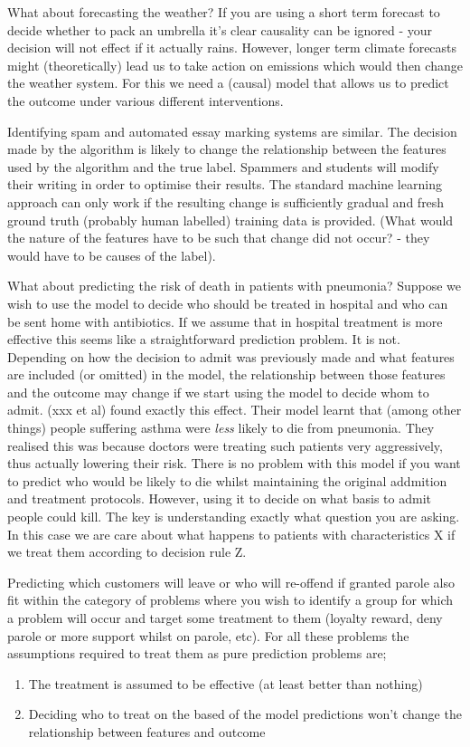 \documentclass[11pt,a4paper,oneside]{book}
\theoremstyle{plain}
\theoremstyle{definition}
\begin{document}
What about forecasting the weather? If you are using a short term forecast to decide whether to pack an umbrella it's clear causality can be ignored - your decision will not effect if it actually rains. However, longer term climate forecasts might (theoretically) lead us to take action on emissions which would then change the weather system. For this we need a (causal) model that allows us to predict the outcome under various different interventions.

Identifying spam and automated essay marking systems are similar. The decision made by the algorithm is likely to change the relationship between the features used by the algorithm and the true label. Spammers and students will modify their writing in order to optimise their results. The standard machine learning approach can only work if the resulting change is sufficiently gradual and fresh ground truth (probably human labelled) training data is provided. (What would the nature of the features have to be such that change did not occur? - they would have to be causes of the label). 

What about predicting the risk of death in patients with pneumonia? Suppose we wish to use the model to decide who should be treated in hospital and who can be sent home with antibiotics. If we assume that in hospital treatment is more effective this seems like a straightforward prediction problem. It is not. Depending on how the decision to admit was previously made and what features are included (or omitted) in the model, the relationship between those features and the outcome may change if we start using the model to decide whom to admit. (xxx et al) found exactly this effect. Their model learnt that (among other things) people suffering asthma were \emph{less} likely to die from pneumonia. They realised this was because doctors were treating such patients very aggressively, thus actually lowering their risk. There is no problem with this model if you want to predict who would be likely to die whilst maintaining the original addmition and treatment protocols. However, using it to decide on what basis to admit people could kill. The key is understanding exactly what question you are asking. In this case we are care about what happens to patients with characteristics X if we treat them according to decision rule Z.   

Predicting which customers will leave or who will re-offend if granted parole also fit within the category of problems where you wish to identify a group for which a problem will occur and target some treatment to them (loyalty reward, deny parole or more support whilst on parole, etc). For all these problems the assumptions required to treat them as pure prediction problems are;
\begin{enumerate}
\item The treatment is assumed to be effective (at least better than nothing)
\item Deciding who to treat on the based of the model predictions won't change the relationship between features and outcome 
\end{enumerate}
\end{document}
